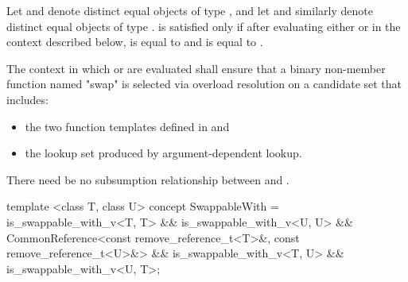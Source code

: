 \begin{itemdescr}
\pnum
Let  and  denote distinct equal objects of type ,
and let  and  similarly denote distinct equal objects of
type .  is satisfied only if after
evaluating either  or  in the context
described below,  is equal to  and  is equal to
.

\pnum
The context in which  or  are evaluated
shall ensure that a binary non-member function named "swap" is selected via
overload resolution on a candidate set that includes:
\begin{itemize}
\item the two  function templates defined in
   and
\item the lookup set produced by argument-dependent
  lookup.
\end{itemize}

\pnum
There need be no subsumption relationship between
and
.
\end{itemdescr}

%
\begin{itemdecl}
template <class T, class U>
concept SwappableWith =
  is_swappable_with_v<T, T> && is_swappable_with_v<U, U> &&
  CommonReference<const remove_reference_t<T>&, const remove_reference_t<U>&> &&
  is_swappable_with_v<T, U> && is_swappable_with_v<U, T>;
\end{itemdecl}

